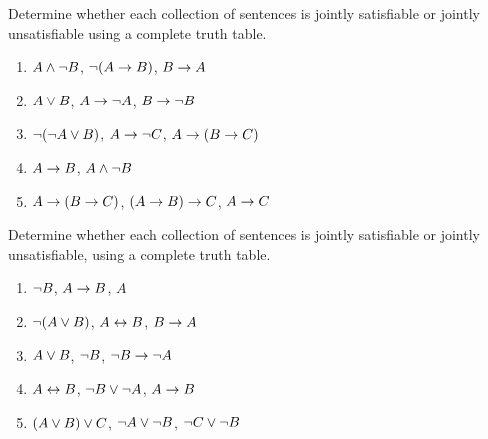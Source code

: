 \problempart
\label{pr.TT.satisfiable2}
Determine whether each collection of sentences is jointly satisfiable or jointly unsatisfiable using a complete truth table.
\begin{enumerate}
\item $A \wedge \neg B$, $\neg(A \rightarrow B)$, $B \rightarrow A$\vspace{.5ex} %
\item $A \vee B$, $A \rightarrow \neg A$, $B \rightarrow \neg B$ \vspace{.5ex}%
\item $\neg(\neg A \vee B) $, $A \rightarrow \neg C$, $A \rightarrow (B \rightarrow C)$\vspace{.5ex} %
\item $A \rightarrow B$, $A \wedge \neg B$\vspace{.5ex} %
\item $A \rightarrow (B \rightarrow C)$, $(A \rightarrow B) \rightarrow C$, $A \rightarrow C$\vspace{.5ex} %
\end{enumerate}

\noindent\problempart
\label{pr.TT.satisfiable3}
Determine whether each collection of sentences is jointly satisfiable or jointly unsatisfiable, using a complete truth table.
\begin{enumerate}
\item $\neg B$, $A \rightarrow B$, $A$ \vspace{.5ex}%
\item $\neg(A \vee B)$, $A \leftrightarrow B$, $B \rightarrow A$\vspace{.5ex} %
\item $A \vee B$, $\neg B$, $\neg B \rightarrow \neg A$\vspace{.5ex} %
\item $A \leftrightarrow B$, $\neg B \vee \neg A$, $A \rightarrow B$\vspace{.5ex} %
\item $(A \vee B) \vee C$, $\neg A \vee \neg B$, $\neg C \vee \neg B$\vspace{.5ex} %
\end{enumerate}

